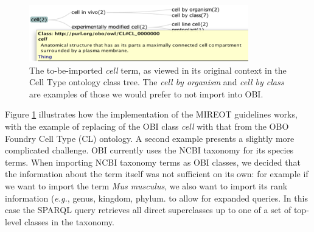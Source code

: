 \documentclass{elsart}       %
\begin{document}


\begin{figure}[t]
\centering \includegraphics*[width=1\columnwidth]{cell}
\caption{The to-be-imported \emph{cell} term, as viewed in its original context in the Cell Type ontology class tree. The \emph{cell by organism} and \emph{cell by class} are examples of those we would prefer to not import into OBI.}
\label{fig:cell}
\end{figure}


Figure \ref{fig:cell} illustrates how the implementation of the MIREOT guidelines works, with the example of  replacing of the OBI class \emph{cell} with that from the OBO Foundry Cell Type (CL) ontology\cite{cell}.
A second example presents a slightly more complicated challenge. %
OBI currently uses the NCBI taxonomy for its species terms.
When importing NCBI taxonomy terms as OBI classes, we decided that the information about the term itself was not sufficient on its own: for example if we want to import the term \emph{Mus musculus}, we also want to import its rank information (\emph{e.g.}, genus, kingdom, phylum. to allow for expanded queries.
In this case the SPARQL query retrieves all direct superclasses up to one of a set of top-level classes in the taxonomy. 
\end{document}

